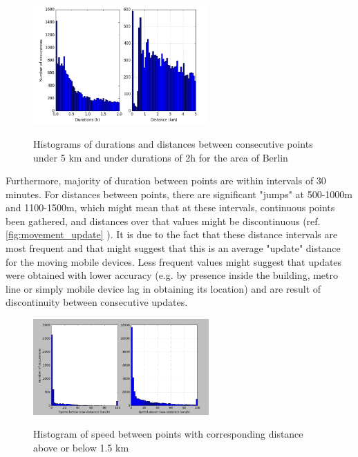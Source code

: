 \begin{figure}[!ht]
	\centering
	\includegraphics[width=0.6\textwidth]{images/berlin_stats_intro.png}\\
	\caption{Histograms of durations and distances between consecutive points under 5 km and under durations of 2h for the area of Berlin}
	\label{fig:ber_stats}
\end{figure}
\FloatBarrier

Furthermore, majority of duration between points are within intervals of 30 minutes. For distances between points, there are significant "jumps" at 500-1000m and 1100-1500m, which might mean that at these intervals, continuous points been gathered, and distances over that values might be discontinuous (ref. \autoref{fig:movement_update} ). It is due to the fact that these distance intervals are most frequent and that might suggest that this is an average "update" distance for the moving mobile devices. Less frequent values might suggest that updates were obtained with lower accuracy (e.g. by presence inside the building, metro line or simply mobile device lag in obtaining its location) and are result of discontinuity between consecutive updates.

\begin{figure}[!ht]
	\centering
	\includegraphics[width=0.6\textwidth]{images/berlin_speeds_distances.png}\\
	\caption{Histogram of speed between points with corresponding distance above or below 1.5 km}
	\label{fig:ber_sp_dis}
\end{figure}
\FloatBarrier


